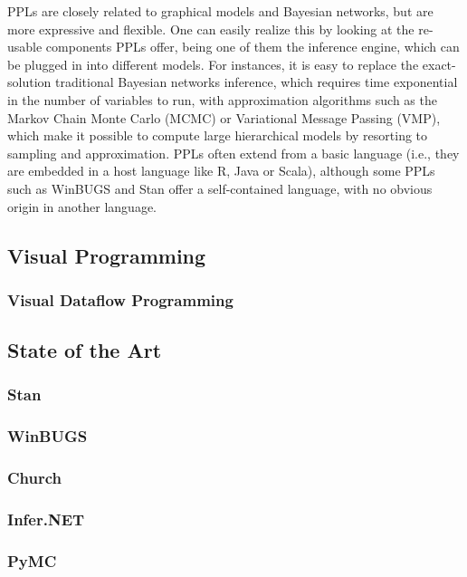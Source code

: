 PPLs are closely related to graphical models and Bayesian networks, but are more
expressive and flexible. One can easily realize this by looking at the re-usable
components PPLs offer, being one of them the inference engine, which can be
plugged in into different models. For instances, it is easy to replace the
exact-solution traditional Bayesian networks inference, which requires time
exponential in the number of variables to run, with approximation algorithms
such as the Markov Chain Monte Carlo (MCMC) or Variational Message Passing
(VMP), which make it possible to compute large hierarchical models by resorting
to sampling and approximation. PPLs often extend from a basic language (i.e.,
they are embedded in a host language like R, Java or Scala), although some PPLs
such as WinBUGS and Stan offer a self-contained language, with no obvious origin
in another language.

\subsection{Visual Programming}

\subsubsection{Visual Dataflow Programming}

\subsection{State of the Art}

\subsubsection{Stan}

\subsubsection{WinBUGS}

\subsubsection{Church}

\subsubsection{Infer.NET}

\subsubsection{PyMC}

